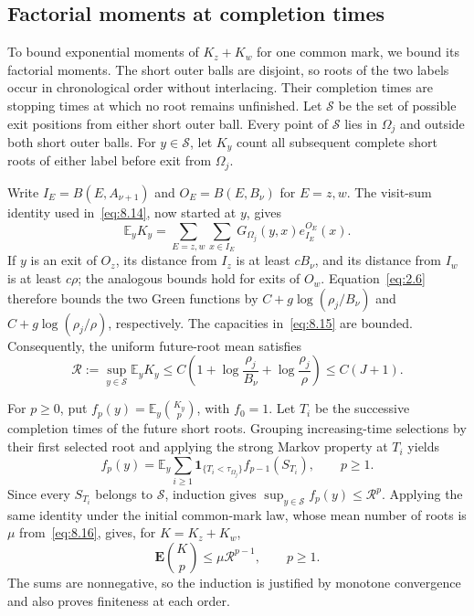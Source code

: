 \documentclass[11pt,letterpaper,reqno]{amsart}
\newif\ifrevmarks \revmarkstrue
\newcommand{\add}[1]{\ifrevmarks\textcolor{revorange}{#1}\else#1\fi}
\numberwithin{equation}{section}
\theoremstyle{remark}
\begin{document}
\subsection{Factorial moments at completion times}\label{sec:factorial}
\add{To bound exponential moments of $K_z+K_w$ for one common mark, we bound its factorial moments.} The short outer balls are disjoint, so roots of the two labels occur in chronological order without interlacing. Their completion times are stopping times at which no root remains unfinished. Let $\mathcal S$ be the set of possible exit positions from either short outer ball. Every point of $\mathcal S$ lies in $\Omega_j$ and outside both short outer balls. For $y\in\mathcal S$, let $K_y$ count all subsequent complete short roots of either label before exit from $\Omega_j$.

Write $I_E=B(E,A_{\nu+1})$ and $O_E=B(E,B_\nu)$ for $E=z,w$. The visit-sum identity used in~\eqref{eq:8.14}, now started at $y$, gives
\[
\mathbb E_yK_y
=\sum_{E=z,w}\sum_{x\in I_E}
G_{\Omega_j}(y,x)e_{I_E}^{O_E}(x).
\]
If $y$ is an exit of $O_z$, its distance from $I_z$ is at least $cB_\nu$, and its distance from $I_w$ is at least $c\rho$; the analogous bounds hold for exits of $O_w$. Equation~\eqref{eq:2.6} therefore bounds the two Green functions by $C+g\log(\rho_j/B_\nu)$ and $C+g\log(\rho_j/\rho)$, respectively. The capacities in~\eqref{eq:8.15} are bounded. Consequently, the uniform future-root mean satisfies
\begin{equation}\label{eq:8.17}
\mathcal R:=\sup_{y\in\mathcal S}\mathbb E_yK_y
\le C\left(1+\log\frac{\rho_j}{B_{\nu}}+\log\frac{\rho_j}{\rho}\right)
\le C(J+1).
\end{equation}

For $p\ge0$, put $f_p(y)=\mathbb E_y\binom{K_y}{p}$, with $f_0=1$. Let $T_i$ be the successive completion times of the future short roots. Grouping increasing-time selections by their first selected root and applying the strong Markov property at $T_i$ yields
\begin{equation}\label{eq:completion-recursion}
f_p(y)=\mathbb E_y\sum_{i\ge1}
\mathbf1_{\{T_i<\tau_{\Omega_j}\}}f_{p-1}(S_{T_i}),
\qquad p\ge1.
\end{equation}
Since every $S_{T_i}$ belongs to $\mathcal S$, induction gives $\sup_{y\in\mathcal S}f_p(y)\le\mathcal R^p$. Applying the same identity under the initial common-mark law, whose mean number of roots is $\mu$ from~\eqref{eq:8.16}, gives, for $K=K_z+K_w$,
\begin{equation}\label{eq:8.18}
\mathbf E\binom Kp\le\mu\mathcal R^{p-1},\qquad p\ge1.
\end{equation}
The sums are nonnegative, so the induction is justified by monotone convergence and also proves finiteness at each order.
\end{document}

